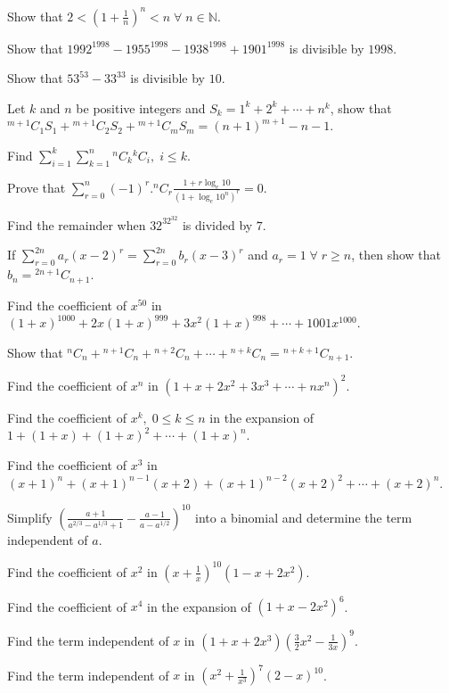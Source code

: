 \item Show that $2<\left(1 + \frac{1}{n}\right)^n < n\;\forall\;n\in\mathbb{N}$.
\item Show that $1992^{1998} - 1955^{1998} - 1938^{1998} + 1901^{1998}$ is divisible by $1998$.
\item Show that $53^{53} - 33^{33}$ is divisible by $10$.
\item Let $k$ and $n$ be positive integers and $S_k = 1^k + 2^k + \cdots + n^k$, show that ${}^{m+1}C_1S_1 + {}^{m+1}C_2S_2 + {}^{m
  + 1}C_mS_m = (n + 1)^{m + 1} - n - 1$.
\item Find $\displaystyle\sum_{i=1}^k\sum_{k=1}^n{}^nC_k{}^kC_i,\;i\leq k$.
\item Prove that $\displaystyle\sum_{r=0}^n(-1)^r.{}^nC_r\frac{1 + r\log_e10}{(1 + \log_e10^n)^r} = 0$.
\item Find the remainder when $32^{32^{32}}$ is divided by $7$.
\item If $\displaystyle\sum_{r=0}^{2n}a_r(x - 2)^r = \sum_{r=0}^{2n}b_r(x - 3)^r$ and $a_r = 1\;\forall\;r\geq n$, then show that
  $b_n = {}^{2n + 1}C_{n + 1}$.
\item Find the coefficient of $x^{50}$ in $(1 + x)^{1000} + 2x(1 + x)^{999} + 3x^2(1 + x)^{998}+ \cdots + 1001x^{1000}$.
\item Show that ${}^nC_n + {}^{n + 1}C_n + {}^{n + 2}C_n + \cdots + {}^{n + k}C_n = {}^{n + k + 1}C_{n + 1}$.
\item Find the coefficient of $x^n$ in $(1 + x + 2x^2 + 3x^3 + \cdots + nx^n)^2$.
\item Find the coefficient of $x^k,\;0\leq k\leq n$ in the expansion of $1 + (1 + x) + (1 + x)^2 + \cdots + (1 + x)^n$.
\item Find the coefficient of $x^3$ in $(x + 1)^n + (x + 1)^{n- 1}(x + 2) + (x + 1)^{n - 2}(x + 2)^2 + \cdots + (x + 2)^n$.
\item Simplify $\left(\frac{a + 1}{a^{2/3} - a^{1/3} + 1} - \frac{a - 1}{a - a^{1/2}}\right)^{10}$ into a binomial and determine
  the term independent of $a$.
\item Find the coefficient of $x^2$ in $\left(x + \frac{1}{x}\right)^{10}(1 - x + 2x^2)$.
\item Find the coefficient of $x^4$ in the expansion of $(1 + x - 2x^2)^6$.
\item Find the term independent of $x$ in $(1 + x + 2x^3)\left(\frac{3}{2}x^2 - \frac{1}{3x}\right)^9$.
\item Find the term independent of $x$ in $\left(x^2 + \frac{1}{x^3}\right)^7(2 - x)^{10}$.
